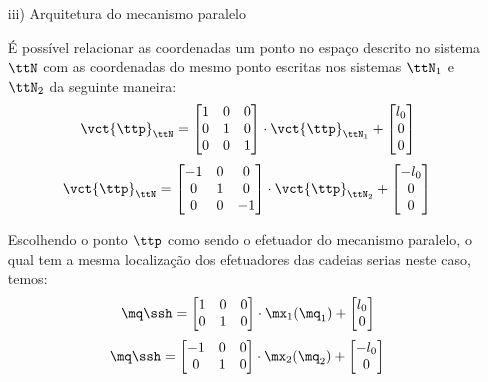 \documentclass[]{politex}
\begin{document}
\begin{itemize}
\item[iii)] Arquitetura do mecanismo paralelo

É possível relacionar as coordenadas um ponto no espaço descrito no sistema $\ttN$ com as coordenadas do mesmo ponto escritas nos sistemas $\ttN_1$ e $\ttN_2$ da seguinte maneira:
\begin{equation}
\vct{\ttp}_{\ttN} = \begin{bmatrix}
1 & 0 & 0 \\
0 & 1 & 0 \\
0 & 0 & 1 \\
\end{bmatrix}
\cdot
\vct{\ttp}_{\ttN_1}
+
\begin{bmatrix}
l_0 \\
0 \\
0 
\end{bmatrix}
\end{equation}
\begin{equation}
\vct{\ttp}_{\ttN} = \begin{bmatrix}
-1 & 0 & 0 \\
0 & 1 & 0 \\
0 & 0 & -1 \\
\end{bmatrix}
\cdot
\vct{\ttp}_{\ttN_2}
+
\begin{bmatrix}
-l_0 \\
0 \\
0 
\end{bmatrix}
\end{equation}

Escolhendo o ponto $\ttp$ como sendo o efetuador do mecanismo paralelo, o qual tem a mesma localização dos efetuadores das cadeias serias neste caso, temos:
\begin{equation}
\mq\ssh = 
\begin{bmatrix}
1 & 0 & 0 \\
0 & 1 & 0 \\
\end{bmatrix}
\cdot
\mx_1(\mq_1)
+
\begin{bmatrix}
l_0 \\
0 \\
\end{bmatrix}
\end{equation}
\begin{equation}
\mq\ssh = 
\begin{bmatrix}
-1 & 0 & 0 \\
0 & 1 & 0 \\
\end{bmatrix}
\cdot
\mx_2(\mq_2)
+
\begin{bmatrix}
-l_0 \\
0 \\
\end{bmatrix}
\end{equation}


\end{itemize}
\end{document}
